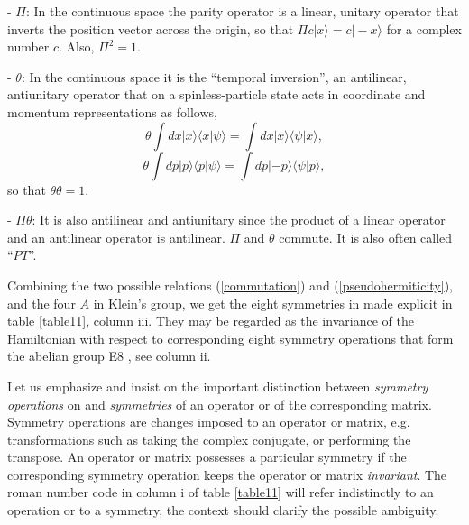 - $\Pi$: In the continuous space the parity operator is a linear, unitary  operator that inverts the position vector across the origin, so that
$\Pi c|x\rangle =c|-x\rangle$ for a complex number $c$. Also, $\Pi^2=1$.

- $\theta$: In the continuous space it is the ``temporal inversion'', an antilinear, antiunitary operator
that on a spinless-particle state acts  in coordinate and momentum representations as follows,
%
\begin{equation}
\label{int1}
\theta \int dx |x\rangle\langle x|\psi\rangle = \int dx |x\rangle\langle \psi|x\rangle,
\end{equation}
%
\begin{equation}
\label{int2}
\theta \int dp |p\rangle\langle p|\psi\rangle = \int dp |-p\rangle\langle \psi |p \rangle,
\end{equation}
%
so that $\theta\theta=1$.

- $\Pi\theta$:  It is also antilinear
and antiunitary
since the product of a linear operator and an antilinear operator is antilinear.
$\Pi$ and $\theta$  commute. It is also often called ``$PT$''.

Combining  the two possible relations (\ref{commutation}) and (\ref{pseudohermiticity}), and the four $A$ in  Klein's group, we get the  eight symmetries in \cite{Ruschhaupt2017}
made explicit in table \ref{table11}, column iii. They may be regarded as the invariance of the Hamiltonian with respect to
corresponding eight symmetry operations that form the abelian group E8 \cite{Simon2019a},
see column ii.

Let us emphasize and insist on the  important distinction between  {\it symmetry operations}  on and {\it symmetries} of an operator or of the corresponding matrix. Symmetry operations are changes imposed  to an operator or matrix,  e.g. transformations such as  taking the complex conjugate, or performing  the transpose. An operator or matrix possesses a particular symmetry if the corresponding symmetry operation keeps the operator or matrix {\it invariant}. The roman number  code in column i  of table \ref{table11} will refer indistinctly to an  operation or to a symmetry,  the context should clarify the possible ambiguity.




